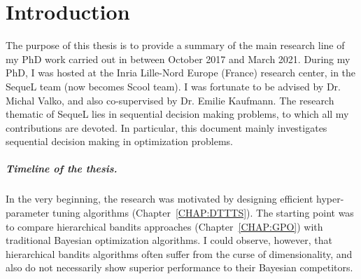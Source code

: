 \chapter{Introduction}\label{CHAP:INTRO}
	\minitoc
	\newpage





The purpose of this thesis is to provide a summary of the main research line of my PhD work carried out in between October 2017 and March 2021. During my PhD, I was hosted at the Inria Lille-Nord Europe (France) research center, in the SequeL team (now becomes Scool team). I was fortunate to be advised by Dr. Michal Valko, and also co-supervised by Dr. Emilie Kaufmann. The research thematic of SequeL lies in sequential decision making problems, to which all my contributions are devoted. In particular, this document mainly investigates sequential decision making in optimization problems.

\paragraph{Timeline of the thesis.} 
In the very beginning, the research was motivated by designing efficient hyper-parameter tuning algorithms (Chapter~\ref{CHAP:DTTTS}). The starting point was to compare hierarchical bandits approaches (Chapter~\ref{CHAP:GPO}) with traditional Bayesian optimization algorithms. I could observe, however, that hierarchical bandits algorithms often suffer from the curse of dimensionality, and also do not necessarily show superior performance to their Bayesian competitors. 

